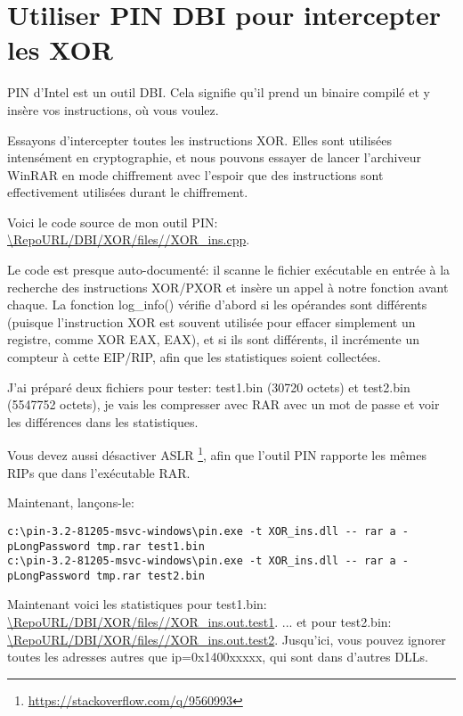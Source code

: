 \section{Utiliser PIN DBI pour intercepter les XOR}

\newcommand{\RepoPinXORURL}{\RepoURL/DBI/XOR/files/}

PIN d'Intel est un outil \ac{DBI}.
Cela signifie qu'il prend un binaire compilé et y insère vos instructions, où vous
voulez.

Essayons d'intercepter toutes les instructions XOR.
Elles sont utilisées intensément en cryptographie, et nous pouvons essayer de lancer l'archiveur
WinRAR en mode chiffrement avec l'espoir que des instructions sont effectivement utilisées durant
le chiffrement.

Voici le code source de mon outil PIN: \url{\RepoPinXORURL/XOR_ins.cpp}.

Le code est presque auto-documenté: il scanne le fichier exécutable en entrée à la recherche
des instructions XOR/PXOR et insère un appel à notre fonction avant chaque.
La fonction log\_info() vérifie d'abord si les opérandes sont différents (puisque
l'instruction XOR est souvent utilisée pour effacer simplement un registre, comme
XOR EAX, EAX), et si ils sont différents, il incrémente un compteur à cette EIP/RIP,
afin que les statistiques soient collectées.

J'ai préparé deux fichiers pour tester: test1.bin (30720 octets) et test2.bin (5547752 octets),
je vais les compresser avec RAR avec un mot de passe et voir les différences dans
les statistiques.

Vous devez aussi désactiver \ac{ASLR}
\footnote{\url{https://stackoverflow.com/q/9560993}},
afin que l'outil PIN rapporte les mêmes RIPs que dans l'exécutable RAR.

Maintenant, lançons-le:

\begin{lstlisting}
c:\pin-3.2-81205-msvc-windows\pin.exe -t XOR_ins.dll -- rar a -pLongPassword tmp.rar test1.bin
c:\pin-3.2-81205-msvc-windows\pin.exe -t XOR_ins.dll -- rar a -pLongPassword tmp.rar test2.bin
\end{lstlisting}

Maintenant voici les statistiques pour test1.bin: \\
\url{\RepoPinXORURL/XOR_ins.out.test1}.
... et pour test2.bin: \\
\url{\RepoPinXORURL/XOR_ins.out.test2}.
Jusqu'ici, vous pouvez ignorer toutes les adresses autres que ip=0x1400xxxxx, qui
sont dans d'autres DLLs.

